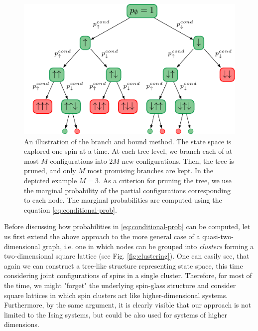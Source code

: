 \begin{figure}
  \centering
  \includegraphics[width=\textwidth]{figures/tree.pdf}
  \caption{An illustration of the branch and bound method. The state space is explored one spin at a time.
    At each tree level, we branch each of at most $M$ configurations into $2M$ new configurations. Then,
    the tree is pruned, and only $M$ most promising branches are kept. In the depicted example $M=3$.
    As a criterion for pruning the tree, we use the marginal probability of the partial configurations
    corresponding to each node. The marginal probabilities are computed using the equation \eqref{eq:conditional-prob}.
  }
  \label{fig:tree}
\end{figure}

Before discussing how probabilities in \eqref{eq:conditional-prob} can be
computed, let us first extend the above approach to the more general case of a
quasi-two-dimensional graph, i.e. one in which nodes can be grouped into
\emph{clusters} forming a two-dimensional square lattice (see Fig.
\ref{fig:clustering}). One can easily see, that again we can construct a
tree-like structure representing state space, this time considering joint
configurations of spins in a single cluster. Therefore, for most of the time,
we might "forget" the underlying spin-glass structure and consider square
lattices in which spin clusters act like higher-dimensional systems.
Furthermore, by the same argument, it is clearly visible that our approach is
not limited to the Ising systems, but could be also used for systems of higher
dimensions.

